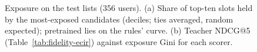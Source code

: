 \begin{figure}[!tb]
\caption{Exposure on the test lists (356 users). (a) Share of top-ten slots held by the
most-exposed candidates (deciles; ties averaged, random expected); pretrained
 lies on the rules' curve. (b) Teacher NDCG@5
(Table~\ref{tab:fidelity-ecir}) against exposure Gini for each scorer.}
\label{fig:exposure}
\end{figure}
